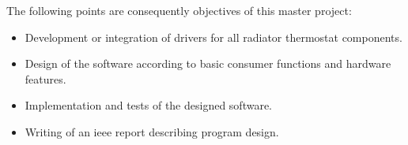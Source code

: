 The following points are consequently objectives of this master project:

\begin{itemize}[noitemsep]
	\item Development or integration of drivers for all radiator thermostat components.
	\item Design of the software according to basic consumer functions and hardware features.
	\item Implementation and tests of the designed software.
	\item Writing of an \acs{ieee} report describing program design.
\end{itemize}

